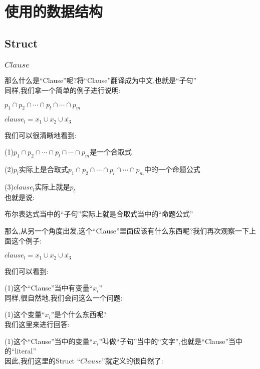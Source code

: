 \section{使用的数据结构}
    \subsection{Struct}
        \subsubsection{$Clause$}
        那么什么是``Clause''呢?将``Clause''翻译成为中文,也就是``子句''\\
    同样,我们拿一个简单的例子进行说明:

    \begin{center}
        $p_{1} \cap p_2 \cap \cdots \cap p_{l} \cap \cdots \cap p_{m}$
    \end{center}

    \begin{center}
        $clause_{l} = x_{1} \cup x_{2} \cup \overline{x_{3}}$
    \end{center}

    \noindent
    我们可以很清晰地看到:\par
        (1)$p_{1} \cap p_2 \cap \cdots \cap p_{l} \cap \cdots \cap p_{m}$是一个合取式\par
        (2)$p_{l}$实际上是合取式$p_{1} \cap p_2 \cap \cdots \cap p_{l} \cap \cdots \cap p_{m}$中的一个命题公式\par
        (3)$clause_{l}$实际上就是$p_{l}$\\
    也就是说:
    \begin{center}
        布尔表达式当中的``子句''实际上就是合取式当中的``命题公式''    
    \end{center}
    \par
    那么,从另一个角度出发,这个``Clause''里面应该有什么东西呢?我们再次观察一下上面这个例子:
    \begin{center}
        $clause_{l} = x_{1} \cup x_{2} \cup \overline{x_{3}}$
    \end{center}

    \noindent
    我们可以看到:\par
        (1)这个``Clause''当中有变量``$x_{i}$''\\
    同样,很自然地,我们会问这么一个问题:\par
        (1)这个变量``$x_{i}$''是个什么东西呢?\\
    我们这里来进行回答:\par
        (1)这个``Clause''当中的变量``$x_{i}$''叫做``子句''当中的``文字'',也就是``Clause''当中的``literal''\\
    因此,我们这里的Struct ``$Clause$''就定义的很自然了:

